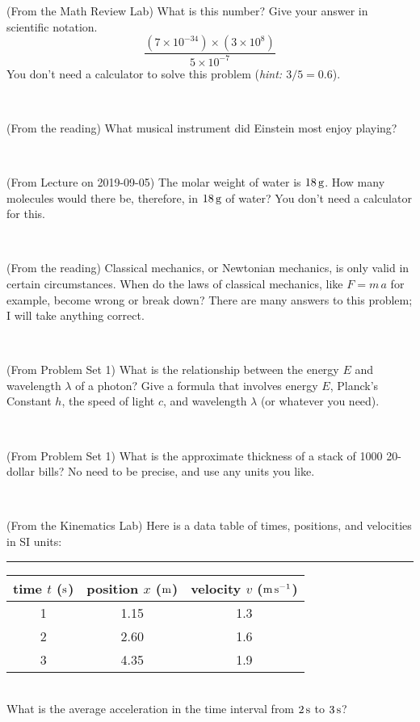 \documentclass[12pt, letterpaper]{article}
\begin{document}
\begin{problem} (From the Math Review Lab)
What is this number? Give your answer in scientific notation.
$$
\frac{(7\times10^{-34})\times(3\times10^8)}{5\times10^{-7}}
$$
You don't need a calculator to solve this problem (\textit{hint: $3/5=0.6$}).
\end{problem}


\vfill ~

\begin{problem} (From the reading)
What musical instrument did Einstein most enjoy playing?
\end{problem}


\vfill ~

\begin{problem} (From Lecture on 2019-09-05)
The molar weight of water is $18\,\mathrm{g}$. How many molecules would there
be, therefore, in $18\,\mathrm{g}$ of water? You don't need a calculator for
this.
\end{problem}


\vfill ~


\clearpage


\begin{problem} (From the reading)
Classical mechanics, or Newtonian mechanics, is only valid in certain
circumstances. When do the laws of classical mechanics, like $F =
m\,a$ for example, become wrong or break down? There are many answers
to this problem; I will take anything correct.
\end{problem}


\vfill ~

\begin{problem} (From Problem Set 1)
What is the relationship between the energy $E$ and wavelength
$\lambda$ of a photon? Give a formula that involves energy $E$,
Planck's Constant $h$, the speed of light $c$, and wavelength
$\lambda$ (or whatever you need).
\end{problem}

\vfill ~

\begin{problem} (From Problem Set 1)
What is the approximate thickness of a stack of 1000 20-dollar bills?
No need to be precise, and use any units you like.
\end{problem}


\vfill ~

\begin{problem} (From the Kinematics Lab)
Here is a data table of times, positions, and velocities in SI units:\\
\rule{1.0in}{0pt}\begin{tabular}{c|c|c}
time $t$ ($\mathrm{s}$) & position $x$ ($\mathrm{m}$) & velocity $v$ ($\mathrm{m}\,\mathrm{s}^{-1}$) \\
\hline
1 & 1.15 & 1.3 \\
2 & 2.60 & 1.6 \\
3 & 4.35 & 1.9 \\
\hline
\end{tabular}\\
What is the average acceleration in the time interval from $2\,\mathrm{s}$ to $3\,\mathrm{s}$?
\end{problem}
\end{document}
